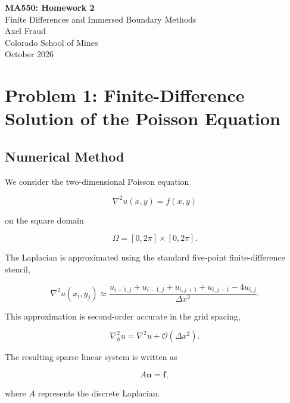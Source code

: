 \documentclass[11pt]{article}
\begin{document}
\begin{center}
    {\LARGE \textbf{MA550: Homework 2}}\\[8pt]
    {\large Finite Differences and Immersed Boundary Methods}\\[10pt]
    Axel Fraud\\
    Colorado School of Mines\\
    October 2026
\end{center}

\vspace{0.5cm}


\section*{Problem 1: Finite-Difference Solution of the Poisson Equation}

\subsection*{Numerical Method}

We consider the two-dimensional Poisson equation

\begin{equation}
    \nabla^2 u(x,y)=f(x,y)
\end{equation}

on the square domain

\[
    \Omega=[0,2\pi]\times[0,2\pi].
\]

The Laplacian is approximated using the standard five-point
finite-difference stencil,

\begin{equation}
    \nabla^2 u(x_i,y_j)
    \approx
    \frac{
    u_{i+1,j}+u_{i-1,j}
    +u_{i,j+1}+u_{i,j-1}
    -4u_{i,j}
    }{\Delta x^2}.
\end{equation}

This approximation is second-order accurate in the grid spacing,

\[
    \nabla_h^2 u
    =
    \nabla^2u+\mathcal{O}(\Delta x^2).
\]

The resulting sparse linear system is written as

\begin{equation}
    A\mathbf{u}=\mathbf{f},
\end{equation}

where $A$ represents the discrete Laplacian.
\end{document}
